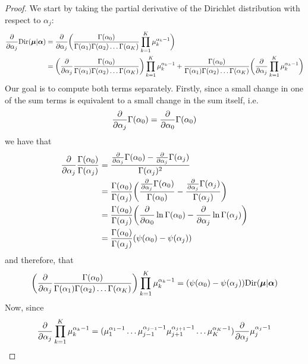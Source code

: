 \vspace{1em}

\begin{proof}
    We start by taking the partial derivative of the Dirichlet
    distribution with respect to $\alpha_j$:
    \begin{align*}
        \pdv{\alpha_j} \text{Dir}(\bm{\mu} | \bm{\alpha})
        &= \pdv{\alpha_j}\bigg(\frac{\Gamma(\alpha_0)}{\Gamma(\alpha_1)\Gamma(\alpha_2)\ldots\Gamma(\alpha_K)}
        \prod_{k = 1}^K \mu_k^{\alpha_k - 1}\bigg) \\
        &= \bigg(\pdv{\alpha_j}\frac{\Gamma(\alpha_0)}{\Gamma(\alpha_1)\Gamma(\alpha_2)\ldots\Gamma(\alpha_K)}\bigg) \prod_{k = 1}^K \mu_k^{\alpha_k - 1} +
        \frac{\Gamma(\alpha_0)}{\Gamma(\alpha_1)\Gamma(\alpha_2)\ldots\Gamma(\alpha_K)}
        \bigg(\pdv{\alpha_j}\prod_{k = 1}^K \mu_k^{\alpha_k - 1}\bigg)
    \end{align*}
    Our goal is to compute both terms separately. Firstly, since
    a small change in one of the sum terms is equivalent to a small
    change in the sum itself, i.e.
    \[
        \pdv{\alpha_j} \Gamma(\alpha_0) = \pdv{\alpha_0} \Gamma(\alpha_0)
    \] 
    we have that
    \begin{align*}
        \pdv{\alpha_j} \frac{\Gamma(\alpha_0)}{\Gamma(\alpha_j)}
        &= \frac{\pdv{\alpha_j}\Gamma(\alpha_0) - \pdv{\alpha_j}\Gamma(\alpha_j)}{\Gamma(\alpha_j)^2} \\
        &= \frac{\Gamma(\alpha_0)}{\Gamma(\alpha_j)} \bigg(\frac{\pdv{\alpha_j} \Gamma(\alpha_0)}
            {\Gamma(\alpha_0)} - \frac{\pdv{\alpha_j} \Gamma(\alpha_j)}{\Gamma(\alpha_j)}\bigg) \\
        &= \frac{\Gamma(\alpha_0)}{\Gamma(\alpha_j)}
        \bigg(\pdv{\alpha_0} \ln \Gamma(\alpha_0) - \pdv{\alpha_j} \ln \Gamma(\alpha_j)\bigg) \\
        &= \frac{\Gamma(\alpha_0)}{\Gamma(\alpha_j)}(\psi(\alpha_0) - \psi(\alpha_j))
    \end{align*}
    and therefore, that
    \[
        \bigg(\pdv{\alpha_j}\frac{\Gamma(\alpha_0)}
        {\Gamma(\alpha_1)\Gamma(\alpha_2)\ldots\Gamma(\alpha_K)}\bigg) 
        \prod_{k = 1}^K \mu_k^{\alpha_k - 1}
        = (\psi(\alpha_0) - \psi(\alpha_j))\text{Dir}(\bm{\mu} | \bm{\alpha})
    \] 
    Now, since 
    \[
        \pdv{\alpha_j} \prod_{k = 1}^K \mu_k^{\alpha_k - 1}
        = (\mu_1^{\alpha_1 - 1}\ldots\mu_{j - 1}^{\alpha_{j - 1} - 1}
        \mu_{j + 1}^{\alpha_{j + 1} - 1}
        \ldots \mu_K^{\alpha_K - 1}) \pdv{\alpha_j} \mu_j^{\alpha_j - 1}
\]
\end{proof}
